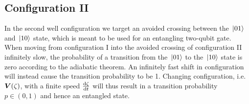 \documentclass[twocolumn,superscriptaddress,unsortedaddress,
 amsmath,amssymb,
 aps,
]{revtex4-2}
\begin{document}
    \subsection{Configuration II}
        In the second well configuration we target an avoided crossing between the $\ket*{01}$ and
        $\ket*{10}$ state, which is meant to be used for an entangling two-qubit gate. When moving from configuration I into the avoided crossing of configuration II infinitely slow, the probability of a transition from the $\ket*{01}$ to the $\ket*{10}$ state is zero according to the adiabatic theorem. An infinitely fast shift in configuration will instead cause the transition probability to be 1. Changing configuration, i.e. $\vb*{V}(\zeta)$, with a finite speed $\dv{\zeta}{t}$ will thus result in a transition probability $p\in(0,1)$ and hence an entangled state. %
        
\end{document}
